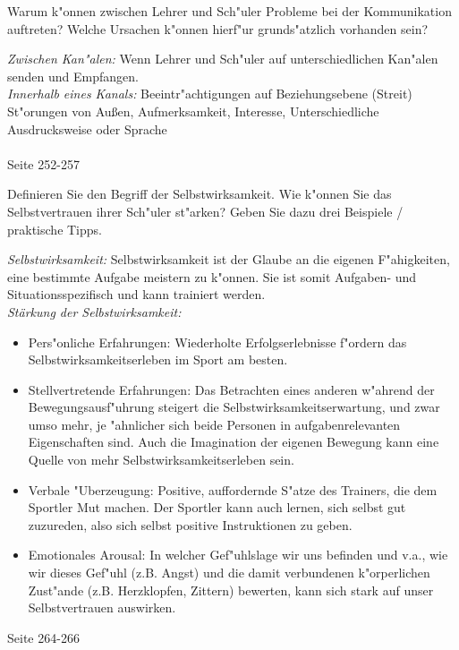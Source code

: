 \begin{question}{5}
Warum k"onnen zwischen Lehrer und Sch"uler Probleme bei der Kommunikation auftreten? Welche Ursachen k"onnen hierf"ur grunds"atzlich vorhanden sein?
\end{question}
\begin{solution}
\emph{Zwischen Kan"alen:} Wenn Lehrer und Sch"uler auf unterschiedlichen Kan"alen senden und Empfangen.\\
\emph{Innerhalb eines Kanals:} Beeintr"achtigungen auf Beziehungsebene (Streit)\\
St"orungen von Außen, Aufmerksamkeit, Interesse, Unterschiedliche Ausdrucksweise oder Sprache\\\\
 Seite 252-257
\end{solution}

\begin{question}{4}
Definieren Sie den Begriff der Selbstwirksamkeit. Wie k"onnen Sie das Selbstvertrauen ihrer Sch"uler st"arken? Geben Sie dazu drei Beispiele / praktische Tipps.
\end{question}
\begin{solution}
\emph{Selbstwirksamkeit:} Selbstwirksamkeit ist der Glaube an die eigenen F"ahigkeiten, eine bestimmte Aufgabe meistern zu k"onnen. Sie ist somit Aufgaben- und Situationsspezifisch und kann trainiert werden.\\
\emph{Stärkung der Selbstwirksamkeit:} 
\begin{itemize}
\item Pers"onliche Erfahrungen: Wiederholte Erfolgserlebnisse f"ordern das Selbstwirksamkeitserleben im Sport am besten.
\item Stellvertretende Erfahrungen: Das Betrachten eines anderen w"ahrend der Bewegungsausf"uhrung steigert die Selbstwirksamkeitserwartung, und zwar umso mehr, je "ahnlicher sich beide Personen in aufgabenrelevanten Eigenschaften sind. Auch die Imagination der eigenen Bewegung kann eine Quelle von mehr Selbstwirksamkeitserleben sein.
\item Verbale "Uberzeugung: Positive, auffordernde S"atze des Trainers, die dem Sportler Mut machen. Der Sportler kann auch lernen, sich selbst gut zuzureden, also sich selbst positive Instruktionen zu geben.
\item Emotionales Arousal: In welcher Gef"uhlslage wir uns befinden und v.a., wie wir dieses Gef"uhl (z.B. Angst) und die damit verbundenen k"orperlichen Zust"ande (z.B. Herzklopfen, Zittern) bewerten, kann sich stark auf unser Selbstvertrauen auswirken.
\end{itemize}
 Seite 264-266
\end{solution}

